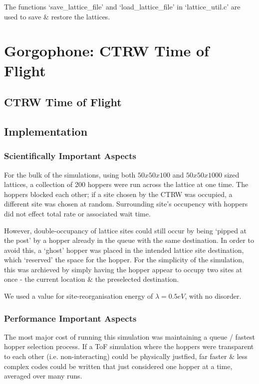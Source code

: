 \documentclass[twocolumn,a4,notitlepage]{report}
\begin{document}
The functions `save\_lattice\_file' and `load\_lattice\_file' in
`lattice\_util.c' are used to save \& restore the lattices.

\chapter{Gorgophone: CTRW Time of Flight}

\section{CTRW Time of Flight}

\section{Implementation}

\subsection{Scientifically Important Aspects}

For the bulk of the simulations, using both $50x50x100$ and $50x50x1000$
sized lattices, a collection of 200 hoppers were run across the lattice at
one time. The hoppers blocked each other; if a site chosen by the CTRW was
occupied, a different site was chosen at random. Surrounding site's
occupency with hoppers did not effect total rate or associated wait time.

However, double-occupancy
of lattice sites could still occur by being `pipped at the post' by a
hopper already in the queue with the same destination.
In order to avoid this, a `ghost' hopper was placed in the
intended lattice site destination, which `reserved' the space for the
hopper. For the simplicity of the simulation, this was archieved by simply
having the hopper appear to occupy two sites at once - the current location
\& the preselected destination.

We used a value for site-reorganisation energy of $\lambda=0.5eV$, with no
disorder.


\subsection{Performance Important Aspects}

The most major cost of running this simulation was maintaining a queue /
fastest hopper selection process. If a ToF simulation where the hoppers were
transparent to each other (i.e. non-interacting) could be physically
justfied, far faster \& less complex codes could be written that just considered one hopper
at a time, averaged over many runs.
\end{document}
